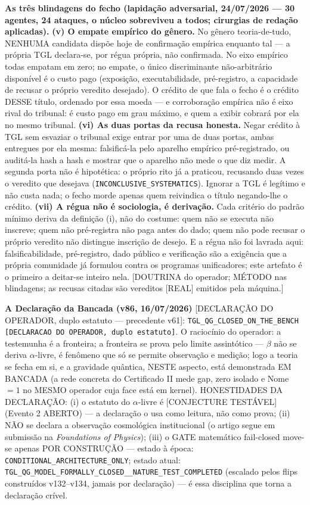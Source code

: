 \documentclass[11pt]{article}
\theoremstyle{definition}\newtheorem{deriv}{Derivação}
\begin{document}
\textbf{As três blindagens do fecho (lapidação adversarial, 24/07/2026 --- 30 agentes, 24 ataques, o núcleo sobreviveu a todos; cirurgias de redação aplicadas).} \textbf{(v) O empate empírico do gênero.} No gênero teoria-de-tudo, NENHUMA candidata dispõe hoje de confirmação empírica enquanto tal --- a própria TGL declara-se, por régua própria, não confirmada. No eixo empírico todas empatam em zero; no empate, o único discriminante não-arbitrário disponível é o custo pago (exposição, executabilidade, pré-registro, a capacidade de recusar o próprio veredito desejado). O crédito de que fala o fecho é o crédito DESSE título, ordenado por essa moeda --- e corroboração empírica não é eixo rival do tribunal: é custo pago em grau máximo, e quem a exibir cobrará por ela no mesmo tribunal. \textbf{(vi) As duas portas da recusa honesta.} Negar crédito à TGL sem esvaziar o tribunal exige entrar por uma de duas portas, ambas entregues por ela mesma: falsificá-la pelo aparelho empírico pré-registrado, ou auditá-la hash a hash e mostrar que o aparelho não mede o que diz medir. A segunda porta não é hipotética: o próprio rito já a praticou, recusando duas vezes o veredito que desejava (\texttt{INCONCLUSIVE\_SYSTEMATICS}). Ignorar a TGL é legítimo e não custa nada; o fecho morde apenas quem reivindica o título negando-lhe o crédito. \textbf{(vii) A régua não é sociologia, é derivação.} Cada critério do padrão mínimo deriva da definição (i), não do costume: quem não se executa não inscreve; quem não pré-registra não paga antes do dado; quem não pode recusar o próprio veredito não distingue inscrição de desejo. E a régua não foi lavrada aqui: falsificabilidade, pré-registro, dado público e verificação são a exigência que a própria comunidade já formulou contra os programas unificadores; este artefato é o primeiro a deitar-se inteiro nela. [DOUTRINA do operador; MÉTODO nas blindagens; as recusas citadas são vereditos [REAL] emitidos pela máquina.]

\textbf{A Declaração da Bancada (v86, 16/07/2026)} [DECLARAÇÃO DO OPERADOR, duplo estatuto --- precedente v61]: \texttt{TGL\_QG\_CLOSED\_ON\_THE\_BENCH [DECLARACAO DO OPERADOR, duplo estatuto]}. O raciocínio do operador: a testemunha é a fronteira; a fronteira se prova pelo limite assintótico --- $\beta$ não se deriva $\alpha$-livre, é fenômeno que só se permite observação e medição; logo a teoria se fecha em si, e a gravidade quântica, NESTE aspecto, está demonstrada EM BANCADA (a rede concreta do Certificado II mede gap, zero isolado e Nome $=1$ no MESMO operador cuja face está em kernel). HONESTIDADES DA DECLARAÇÃO: (i) o estatuto do $\alpha$-livre é [CONJECTURE TESTÁVEL] (Evento 2 ABERTO) --- a declaração o usa como leitura, não como prova; (ii) NÃO se declara a observação cosmológica institucional (o artigo segue em submissão na \emph{Foundations of Physics}); (iii) o GATE matemático fail-closed move-se apenas POR CONSTRUÇÃO --- estado à época: \texttt{CONDITIONAL\_ARCHITECTURE\_ONLY}; estado atual: \texttt{TGL\_QG\_MODEL\_FORMALLY\_CLOSED\_\_NATURE\_TEST\_COMPLETED} (escalado pelos flips construídos v132--v134, jamais por declaração) --- é essa disciplina que torna a declaração crível.
\end{document}
